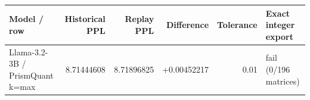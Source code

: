 \begin{tabular}{lrrrrl}
\toprule
Model / row & Historical PPL & Replay PPL & Difference & Tolerance & Exact integer export \\
\midrule
Llama-3.2-3B / PrismQuant k=max & 8.71444608 & 8.71896825 & +0.00452217 & 0.01 & fail (0/196 matrices) \\
\bottomrule
\end{tabular}
